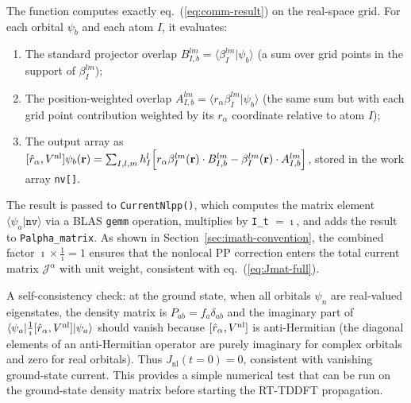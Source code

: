 The function computes exactly eq.~(\ref{eq:comm-result}) on the
real-space grid.
For each orbital $\psi_b$ and each atom $I$, it evaluates:
\begin{enumerate}
  \item The standard projector overlap
    $B^{lm}_{I,b} = \langle\beta^{lm}_I|\psi_b\rangle$
    (a sum over grid points in the support of $\beta^{lm}_I$);
  \item The position-weighted overlap
    $A^{lm}_{I,b} = \langle r_\alpha\beta^{lm}_I|\psi_b\rangle$
    (the same sum but with each grid point contribution weighted
    by its $r_\alpha$ coordinate relative to atom $I$);
  \item The output array as
    $[\hat{r}_\alpha,V^{\mathrm{nl}}]\psi_b(\mathbf{r})
    = \sum_{I,l,m} h^l_I\!\left[
      r_\alpha\beta^{lm}_I(\mathbf{r})\cdot B^{lm}_{I,b}
      - \beta^{lm}_I(\mathbf{r})\cdot A^{lm}_{I,b}
    \right]$,
    stored in the work array \texttt{nv[]}.
\end{enumerate}
The result is passed to \texttt{CurrentNlpp()}, which computes the
matrix element $\langle\psi_a|\texttt{nv}\rangle$ via a BLAS
\texttt{gemm} operation, multiplies by \texttt{I\_t} $= \imath$,
and adds the result to \texttt{Palpha\_matrix}.
As shown in Section~\ref{sec:imath-convention}, the combined factor
$\imath \times \frac{1}{\imath} = 1$ ensures that the nonlocal PP
correction enters the total current matrix
$\boldsymbol{\mathcal{J}}^\alpha$ with unit weight, consistent with
eq.~(\ref{eq:Jmat-full}).

A self-consistency check: at the ground state, when all orbitals
$\psi_n$ are real-valued eigenstates, the density matrix is
$P_{ab} = f_a\delta_{ab}$ and the imaginary part of
$\langle\psi_a|\frac{1}{\imath}[\hat{r}_\alpha,V^{\mathrm{nl}}]|\psi_a\rangle$
should vanish because $[\hat{r}_\alpha,V^{\mathrm{nl}}]$ is anti-Hermitian
(the diagonal elements of an anti-Hermitian operator are purely
imaginary for complex orbitals and zero for real orbitals).
Thus $J_\mathrm{nl}(t=0) = 0$, consistent with vanishing ground-state
current.
This provides a simple numerical test that can be run on the
ground-state density matrix before starting the RT-TDDFT propagation.
